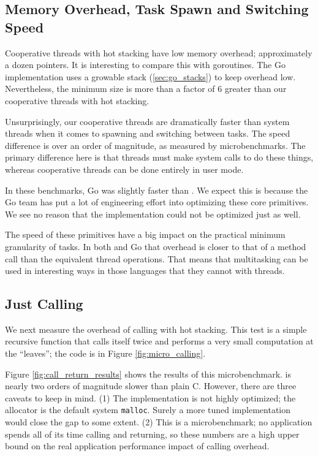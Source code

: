 \documentclass[a4paper,UKenglish,cleveref, autoref]{lipics-v2019}
\begin{document}
\subsection{Memory Overhead, Task Spawn and Switching Speed}

Cooperative threads with hot stacking have low memory overhead; approximately a dozen pointers.
It is interesting to compare this with goroutines.
The Go implementation uses a growable stack (\textsection\ref{sec:go_stacks}) to keep overhead low.
Nevertheless, the minimum size is more than a factor of 6 greater than our cooperative threads with hot stacking.

Unsurprisingly, our cooperative threads are dramatically faster than system threads when it comes to spawning and switching between tasks.
The speed difference is over an order of magnitude, as measured by microbenchmarks.
The primary difference here is that threads must make system calls to do these things, whereas cooperative threads can be done entirely in user mode.

In these benchmarks, Go was slightly faster than \charcoal{}.
We expect this is because the Go team has put a lot of engineering effort into optimizing these core primitives.
We see no reason that the \charcoal{} implementation could not be optimized just as well.

The speed of these primitives have a big impact on the practical minimum granularity of tasks.
In both \charcoal{} and Go that overhead is closer to that of a method call than the equivalent thread operations.
That means that multitasking can be used in interesting ways in those languages that they cannot with threads.

\subsection{Just Calling}

We next measure the overhead of calling with hot stacking.
This test is a simple recursive function that calls itself twice and performs a very small computation at the ``leaves''; the code is in Figure \ref{fig:micro_calling}.

Figure \ref{fig:call_return_results} shows the results of this microbenchmark.
\charcoal{} is nearly two orders of magnitude slower than plain C.
However, there are three caveats to keep in mind.
(1) The \charcoal{} implementation is not highly optimized; the allocator is the default system \texttt{malloc}.
Surely a more tuned implementation would close the gap to some extent.
(2) This is a microbenchmark; no application spends all of its time calling and returning, so these numbers are a high upper bound on the real application performance impact of calling overhead.
\end{document}
